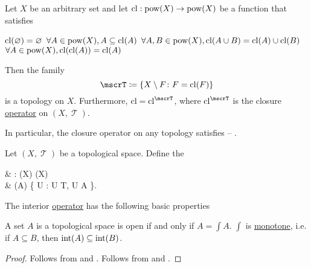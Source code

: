 \begin{proposition}\label{thm:topological_closure_operator_axioms}
  Let \( X \) be an arbitrary set and let \( \operatorname{cl}: \operatorname{pow}(X) \to \operatorname{pow}(X) \) be a function that satisfies
  \begin{thmenum}
     \( \operatorname{cl}(\varnothing) = \varnothing \)
     \( \forall A \in \operatorname{pow}(X), A \subseteq \operatorname{cl}(A) \)
     \( \forall A, B \in \operatorname{pow}(X), \operatorname{cl}(A \cup B) = \operatorname{cl}(A) \cup \operatorname{cl}(B) \)
     \( \forall A \in \operatorname{pow}(X), \operatorname{cl}(\operatorname{cl}(A)) = \operatorname{cl}(A) \)
  \end{thmenum}

  Then the family
  \begin{equation*}
    \mscrT \coloneqq \{ X \setminus F \colon F = \cl(F) \}
  \end{equation*}
  is a topology on \( X \). Furthermore, \( \cl = \cl^{\mscrT} \), where \( \cl^{\mscrT} \) is the closure \hyperref[def:topological_closure_operator]{operator} on \( (X, \mscrT) \).

  In particular, the closure operator on any topology satisfies  -- .
\end{proposition}

\begin{definition}\label{def:interior_operator}
  Let \( (X, \mscrT) \) be a topological space. Define the 
  \begin{balign*}
     & \Int: \pow(X) \to \pow(X)                                     \\
     & \Int(A) \coloneqq \bigcup \{ U : U \in T, U \subseteq A \}.
  \end{balign*}
\end{definition}

\begin{proposition}\label{thm:def:interior_operator/properties}
  The interior \hyperref[def:interior_operator]{operator} has the following basic properties
  \begin{thmenum}
     A set \( A \) is a topological space is open if and only if \( A = \int A \).
     \( \int \) is \hyperref[def:partially_ordered_set/homomorphism]{monotone}, i.e. if \( A \subseteq B \), then \( \operatorname{int}(A) \subseteq \operatorname{int}(B) \).
  \end{thmenum}
\end{proposition}
\begin{proof}
   Follows from  and .
   Follows from  and .
\end{proof}

